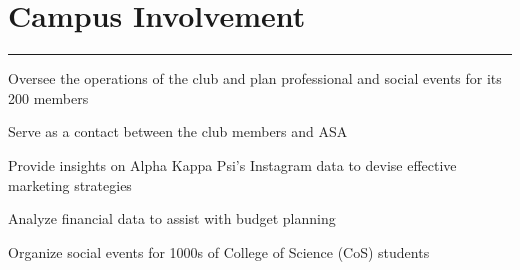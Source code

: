 \documentclass[]{sahana}
\begin{document}
\begin{minipage}[t]{0.66\textwidth}
\section{Campus Involvement}
\noindent\rule{12.5cm}{0.4pt}

\vspace{-6pt}
\begin{tightemize}
\item Oversee the operations of the club and plan professional and social events for its 200 members
\item Serve as a contact between the club members and ASA
\end{tightemize}
\vspace{1pt}

\vspace{-5pt}
\begin{tightemize}
\item Provide insights on Alpha Kappa Psi's Instagram data to devise effective marketing strategies 
\item Analyze financial data to assist with budget planning 
\end{tightemize}
\vspace{1pt}

\vspace{-5pt}
\begin{tightemize}
\item Organize social events for 1000s of College of Science (CoS) students
\end{tightemize}

\end{minipage}
\end{document}
